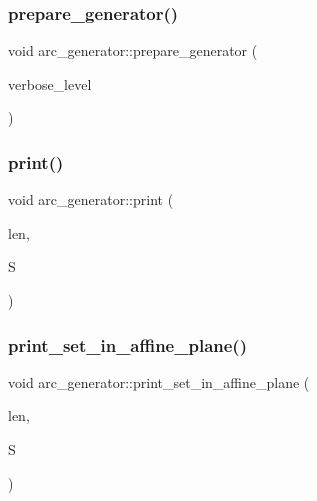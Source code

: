 \subsubsection{\texorpdfstring{prepare\+\_\+generator()}{prepare\_generator()}}
{\footnotesize\ttfamily void arc\+\_\+generator\+::prepare\+\_\+generator (\begin{DoxyParamCaption}\item[{\mbox{\hyperlink{galois_8h_a09fddde158a3a20bd2dcadb609de11dc}{I\+NT}}}]{verbose\+\_\+level }\end{DoxyParamCaption})}

\mbox{\label{classarc__generator_a4ae2e25ba85a60fb2a90a7b4f52675f7}} 
\subsubsection{\texorpdfstring{print()}{print()}}
{\footnotesize\ttfamily void arc\+\_\+generator\+::print (\begin{DoxyParamCaption}\item[{\mbox{\hyperlink{galois_8h_a09fddde158a3a20bd2dcadb609de11dc}{I\+NT}}}]{len,  }\item[{\mbox{\hyperlink{galois_8h_a09fddde158a3a20bd2dcadb609de11dc}{I\+NT}} $\ast$}]{S }\end{DoxyParamCaption})}

\mbox{\label{classarc__generator_a801636de7629e28a0b6e9e5d507bb6a1}} 
\subsubsection{\texorpdfstring{print\+\_\+set\+\_\+in\+\_\+affine\+\_\+plane()}{print\_set\_in\_affine\_plane()}}
{\footnotesize\ttfamily void arc\+\_\+generator\+::print\+\_\+set\+\_\+in\+\_\+affine\+\_\+plane (\begin{DoxyParamCaption}\item[{\mbox{\hyperlink{galois_8h_a09fddde158a3a20bd2dcadb609de11dc}{I\+NT}}}]{len,  }\item[{\mbox{\hyperlink{galois_8h_a09fddde158a3a20bd2dcadb609de11dc}{I\+NT}} $\ast$}]{S }\end{DoxyParamCaption})}

